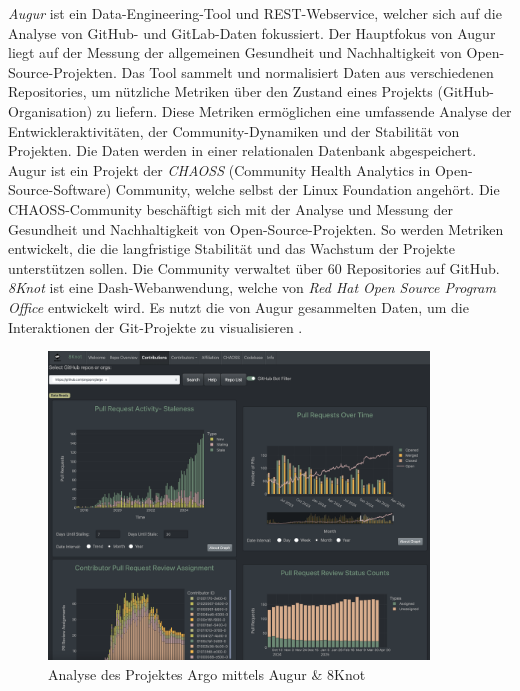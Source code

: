 \textit{Augur} ist ein Data-Engineering-Tool und REST-Webservice, welcher sich auf die Analyse von GitHub- und GitLab-Daten fokussiert. Der Hauptfokus von Augur liegt auf der Messung der allgemeinen Gesundheit und Nachhaltigkeit von Open-Source-Projekten. Das Tool sammelt und normalisiert Daten aus verschiedenen Repositories, um nützliche Metriken über den Zustand eines Projekts (GitHub-Organisation) zu liefern. Diese Metriken ermöglichen eine umfassende Analyse der Entwickleraktivitäten, der Community-Dynamiken und der Stabilität von Projekten. Die Daten werden in einer relationalen Datenbank abgespeichert. \parencite{noauthor_chaossaugur_nodate} Augur ist ein Projekt der \textit{CHAOSS} (Community Health Analytics in Open-Source-Software) Community, welche selbst der Linux Foundation angehört. Die CHAOSS-Community beschäftigt sich mit der Analyse und Messung der Gesundheit und Nachhaltigkeit von Open-Source-Projekten. So werden Metriken entwickelt, die die langfristige Stabilität und das Wachstum der Projekte unterstützen sollen. Die Community verwaltet über 60 Repositories auf GitHub. \parencite{noauthor_chaoss_nodate} \parencite{noauthor_about_nodate-1}
\newpage
\textit{8Knot} ist eine Dash-Webanwendung, welche von \textit{Red Hat Open Source Program Office} entwickelt wird. Es nutzt die von Augur gesammelten Daten, um die Interaktionen der Git-Projekte zu visualisieren \parencite{noauthor_chaossaugur_nodate} \parencite{noauthor_oss-aspen8knot_2025}. 
\begin{figure}[htbp]
    \centering
    \includegraphics[width=0.9\textwidth]{Figures/augur-8knot.png}
    \caption{Analyse des Projektes Argo mittels Augur \& 8Knot \parencite{noauthor_metrixchaossio_nodate} \parencite{noauthor_argoprojargo-workflows_2025}}
    \label{fig:augur-8knot}
\end{figure}


